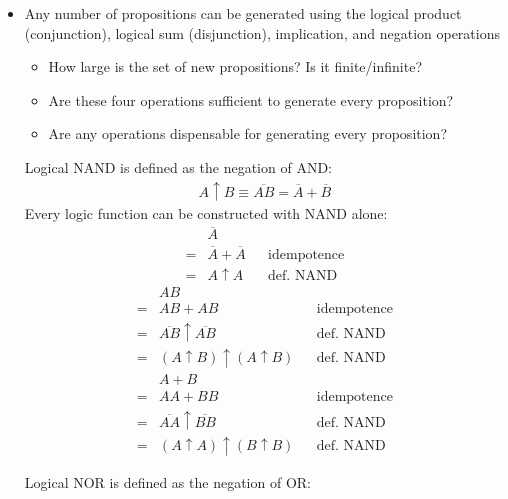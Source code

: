 \documentclass[9pt, letterpaper]{article}
\begin{document}
\begin{itemize}
    \item{Any number of propositions can be generated using the logical product (conjunction), logical sum (disjunction), implication, and negation operations}
        \begin{itemize}
            \item{How large is the set of new propositions? Is it finite/infinite?}
            \item{Are these four operations sufficient to generate every proposition?}
            \item{Are any operations dispensable for generating every proposition?}
        \end{itemize}
    \begin{item}
        Logical NAND is defined as the negation of AND:
        \begin{align*}
            A \uparrow B \equiv \overline{AB} = \overline{A} + \overline{B}
        \end{align*}
        Every logic function can be constructed with NAND alone:
        \begin{align*}
            & \overline{A} \\
            = &\overline{A} + \overline{A} && \text{idempotence} \\
            = &A \uparrow A && \text{def. NAND}
        \end{align*}
        \begin{align*}
            & AB \\
            = &AB + AB && \text{idempotence} \\
            = &\overline{AB} \uparrow \overline{AB} && \text{def. NAND} \\
            = &\left(A \uparrow B \right) \uparrow \left(A \uparrow B \right) && \text{def. NAND}
        \end{align*}
        \begin{align*}
            & A+B \\
            = & AA+BB && \text{idempotence} \\
            = & \overline{AA} \uparrow \overline{BB} && \text{def. NAND} \\
            = &\left(A \uparrow A \right) \uparrow \left(B \uparrow B \right) && \text{def. NAND}
        \end{align*}
    \end{item}
    \begin{item}
        Logical NOR is defined as the negation of OR:

\end{item}
\end{itemize}
\end{document}
